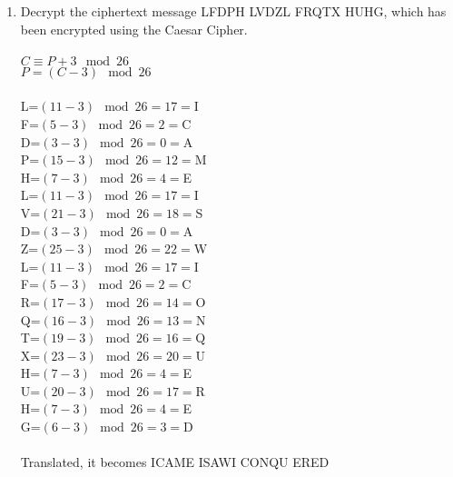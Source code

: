 \documentclass[]{article}
\begin{document}
\begin{enumerate}
    \item Decrypt the ciphertext message LFDPH LVDZL FRQTX HUHG, which has been encrypted using the Caesar Cipher.
    \\\\$C \equiv P + 3 \mod 26$
    \\$P=(C-3) \mod 26$
    \\\\L=$(11-3) \mod 26 = 17 = $I
    \\F=$(5-3) \mod 26 = 2 = $C
    \\D=$(3-3) \mod 26 = 0 = $A
    \\P=$(15-3) \mod 26 = 12 = $M
    \\H=$(7-3) \mod 26 = 4 = $E
    \\L=$(11-3) \mod 26 = 17 = $I
    \\V=$(21-3) \mod 26 = 18 = $S
    \\D=$(3-3) \mod 26 = 0 = $A
    \\Z=$(25-3) \mod 26 = 22 = $W
    \\L=$(11-3) \mod 26 = 17 = $I
    \\F=$(5-3) \mod 26 = 2 = $C
    \\R=$(17-3) \mod 26 = 14 = $O
    \\Q=$(16-3) \mod 26 = 13 = $N
    \\T=$(19-3) \mod 26 = 16 = $Q
    \\X=$(23-3) \mod 26 = 20 = $U
    \\H=$(7-3) \mod 26 = 4 = $E
    \\U=$(20-3) \mod 26 = 17 = $R
    \\H=$(7-3) \mod 26 = 4 = $E
    \\G=$(6-3) \mod 26 = 3 = $D
    \\\\Translated, it becomes ICAME ISAWI CONQU ERED


\end{enumerate}
\end{document}
